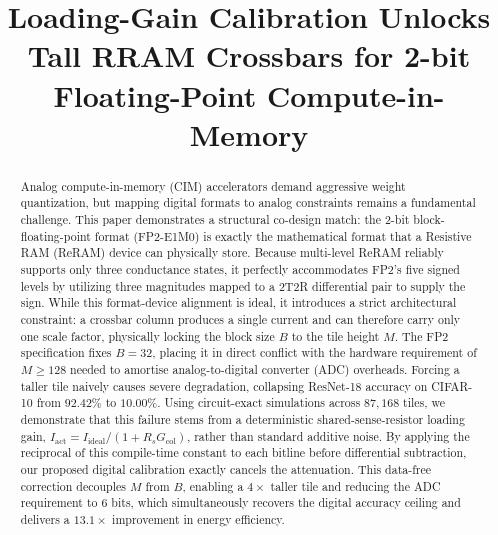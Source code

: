 \documentclass[conference]{IEEEtran}
\begin{document}
\title{Loading-Gain Calibration Unlocks Tall RRAM Crossbars for 2-bit Floating-Point Compute-in-Memory\\
}
\maketitle

\begin{abstract}
Analog compute-in-memory (CIM) accelerators demand aggressive weight quantization, but mapping digital formats to analog constraints remains a fundamental challenge. This paper demonstrates a structural co-design match: the 2-bit block-floating-point format (FP2-E1M0) is exactly the mathematical format that a Resistive RAM (ReRAM) device can physically store. Because multi-level ReRAM reliably supports only three conductance states, it perfectly accommodates FP2's five signed levels by utilizing three magnitudes mapped to a 2T2R differential pair to supply the sign.
While this format-device alignment is ideal, it introduces a strict architectural constraint: a crossbar column produces a single current and can therefore carry only one scale factor, physically locking the block size $B$ to the tile height $M$. The FP2 specification fixes $B=32$, placing it in direct conflict with the hardware requirement of $M \ge 128$ needed to amortise analog-to-digital converter (ADC) overheads. Forcing a taller tile naively causes severe degradation, collapsing ResNet-18 accuracy on CIFAR-10 from $92.42\%$ to $10.00\%$. Using circuit-exact simulations across $87{,}168$ tiles, we demonstrate that this failure stems from a deterministic shared-sense-resistor loading gain, $I_{\text{act}} = I_{\text{ideal}}/(1 + R_s G_{\text{col}})$, rather than standard additive noise. By applying the reciprocal of this compile-time constant to each bitline before differential subtraction, our proposed digital calibration exactly cancels the attenuation. This data-free correction decouples $M$ from $B$, enabling a $4\times$ taller tile and reducing the ADC requirement to 6 bits, which simultaneously recovers the digital accuracy ceiling and delivers a $13.1\times$ improvement in energy efficiency.
\end{abstract}
\end{document}
